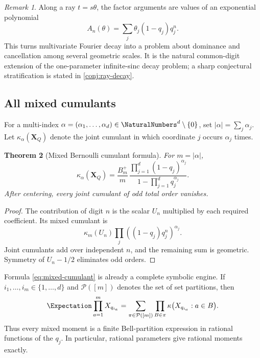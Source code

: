 \documentclass[11pt,a4paper]{article}
\newtheorem{theorem}{Theorem}[section]
\theoremstyle{definition}
\theoremstyle{remark}
\newtheorem{remark}[theorem]{Remark}
\newcommand{\cP}{\mathcal{P}}
\newcommand{\vct}[1]{\boldsymbol{#1}}
\begin{document}
\begin{remark}
Along a ray $t=s\theta$, the factor arguments are values of an exponential polynomial
\[
 A_n(\theta)=\sum_j\theta_j(1-q_j)q_j^n.
\]
This turns multivariate Fourier decay into a problem about dominance and cancellation among several geometric scales.  It is the natural common-digit extension of the one-parameter infinite-sinc decay problem; a sharp conjectural stratification is stated in \cref{conj:ray-decay}.
\end{remark}

\subsection{All mixed cumulants}

For a multi-index $\alpha=(\alpha_1,\ldots,\alpha_d)\in\NaturalNumbers^d\setminus\{0\}$, set $|\alpha|=\sum_j\alpha_j$.  Let $\kappa_\alpha(\vct X_Q)$ denote the joint cumulant in which coordinate $j$ occurs $\alpha_j$ times.

\begin{theorem}[Mixed Bernoulli cumulant formula]
\label{thm:mixed-cumulants}
For $m=|\alpha|$,
\begin{equation}
 \boxed{
 \kappa_\alpha(\vct X_Q)
  =\frac{B_m^+}{m}\,
    \frac{\prod_{j=1}^d(1-q_j)^{\alpha_j}}
         {1-\prod_{j=1}^dq_j^{\alpha_j}}.}
 \label{eq:mixed-cumulant}
\end{equation}
After centering, every joint cumulant of odd total order vanishes.
\end{theorem}

\begin{proof}
The contribution of digit $n$ is the scalar $U_n$ multiplied by each required coefficient.  Its mixed cumulant is
\[
  \kappa_m(U_n)\prod_j((1-q_j)q_j^n)^{\alpha_j}.
\]
Joint cumulants add over independent $n$, and the remaining sum is geometric.  Symmetry of $U_n-1/2$ eliminates odd orders.
\end{proof}

Formula \eqref{eq:mixed-cumulant} is already a complete symbolic engine.  If $i_1,\ldots,i_m\in\{1,\ldots,d\}$ and $\cP([m])$ denotes the set of set partitions, then
\begin{equation}
  \Expectation\prod_{a=1}^mX_{q_{i_a}}
   =\sum_{\pi\in\cP([m])}\prod_{B\in\pi}
      \kappa\bigl(X_{q_{i_a}}:a\in B\bigr).
  \label{eq:multivariate-bell}
\end{equation}
Thus every mixed moment is a finite Bell-partition expression in rational functions of the $q_j$.  In particular, rational parameters give rational moments exactly.
\end{document}
